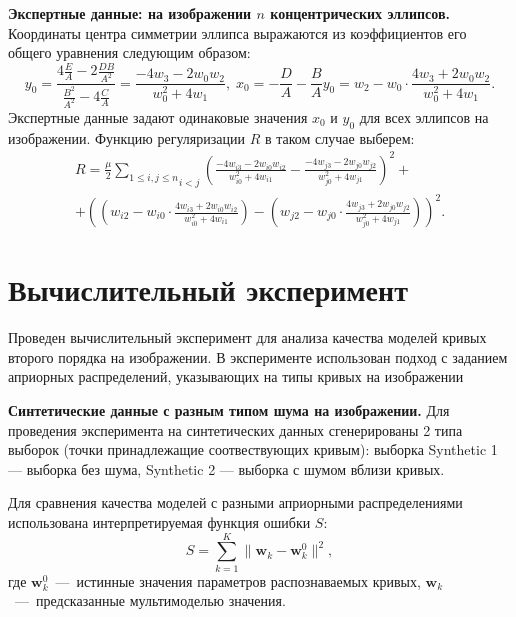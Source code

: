\documentclass[12pt,twoside]{article}
\begin{document}
\textbf{Экспертные данные: на изображении $n$ концентрических эллипсов. }
Координаты центра симметрии эллипса выражаются из коэффициентов его общего уравнения следующим образом: \begin{equation}y_0 = \frac{4\frac{E}{A} - 2 \frac{DB}{A^2}}{\frac{B^2}{A^2} - 4\frac{C}{A}} = \frac{-4w_3 - 2w_0w_2}{w_0^2 + 4w_1}, \; x_0 = -\frac{D}{A} - \frac{B}{A}y_0 = w_2 - w_0 \cdot \frac{4w_3 + 2w_0w_2}{w_0^2 + 4w_1}.\end{equation}
Экспертные данные задают одинаковые значения $x_0$ и $y_0$ для всех эллипсов на изображении. Функцию регуляризации $R$ в таком случае выберем: \begin{equation} \label{53} \begin{split} R = \frac{\mu}{2} \underset{i < j}{\sum\limits_{1 \leq i, j \leq n}} \left(\frac{-4w_{i3} - 2w_{i0}w_{i2}}{w_{i0}^2 + 4w_{i1}} - \frac{-4w_{j3} - 2w_{j0}w_{j2}}{w_{j0}^2 + 4w_{j1}}\right)^2 + \\ + \left(\left(w_{i2} - w_{i0} \cdot \frac{4w_{i3} + 2w_{i0}w_{i2}}{w_{i0}^2 + 4w_{i1}}\right) - \left(w_{j2} - w_{j0} \cdot \frac{4w_{j3} + 2w_{j0}w_{j2}}{w_{j0}^2 + 4w_{j1}}\right)\right)^2. \end{split} \end{equation}


\section{Вычислительный эксперимент}

Проведен вычислительный эксперимент для анализа качества моделей кривых второго порядка на изображении. В эксперименте использован подход с заданием априорных распределений, указывающих на типы кривых на изображении

\textbf{Синтетические данные с разным типом шума на изображении.} Для проведения эксперимента на синтетических данных сгенерированы 2 типа выборок (точки принадлежащие соотвествующих кривым): выборка Synthetic 1 — выборка без шума, Synthetic 2 — выборка с шумом
вблизи кривых. 

Для сравнения качества моделей с разными априорными распределениями использована интерпретируемая функция ошибки $S$:
\begin{equation}\label{Sfunc}
    S = \sum\limits_{k=1}^{K}\|\textbf{w}_k - \textbf{w}_k^0\|^2,
\end{equation}
где $\textbf{w}_k^0$~---~истинные значения параметров распознаваемых кривых, $\textbf{w}_k$~---~предсказанные мультимоделью значения. 
\end{document}

